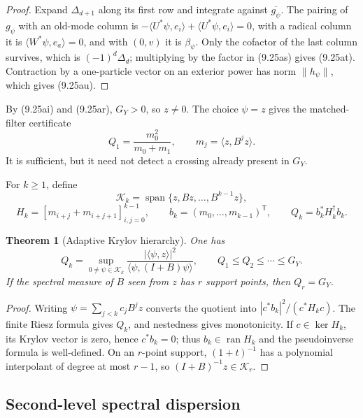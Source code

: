 \documentclass[11pt]{amsart}
\newtheorem{theorem}{Theorem}[section]
\theoremstyle{definition}
\theoremstyle{remark}
\begin{document}
\begin{proof}
Expand \(\Delta_{d+1}\) along its first row and integrate against
\(\overline{g_\psi}\).  The pairing of \(g_\psi\) with an old-mode column
is \(-\langle U^*\psi,e_i\rangle+\langle U^*\psi,e_i\rangle=0\), with a
radical column it is \(\langle W^*\psi,e_a\rangle=0\), and with \((0,v)\)
it is \(\beta_\psi\).  Only the cofactor of the last column survives,
which is \((-1)^d\Delta_d\); multiplying by the factor in (9.25as) gives
(9.25at).  Contraction by a
one-particle vector on an exterior power has norm \(\|h_\psi\|\), which
gives (9.25au).
\end{proof}

By (9.25ai) and (9.25ar), \(G_Y>0\), so \(z\ne0\).  The choice
\(\psi=z\) gives the matched-filter certificate
\[
 Q_1=\frac{m_0^2}{m_0+m_1},
 \qquad m_j=\langle z,B^jz\rangle .
\tag{9.25av}
\]
It is sufficient, but it need not detect a crossing already present in
\(G_Y\).

For \(k\ge1\), define
\[
 \mathcal K_k=\operatorname{span}\{z,Bz,\ldots,B^{k-1}z\},
\]
\[
 H_k=[m_{i+j}+m_{i+j+1}]_{i,j=0}^{k-1},\qquad
 b_k=(m_0,\ldots,m_{k-1})^{\mathsf T},\qquad
 Q_k=b_k^*H_k^\dagger b_k .
\tag{9.25aw}
\]

\begin{theorem}[Adaptive Krylov hierarchy]
\label{thm:adaptive-krylov}
One has
\[
 \boxed{
 Q_k=\sup_{0\ne\psi\in\mathcal K_k}
 \frac{|\langle\psi,z\rangle|^2}
  {\langle\psi,(I+B)\psi\rangle},
 \qquad
 Q_1\le Q_2\le\cdots\le G_Y.}
\tag{9.25ax}
\]
If the spectral measure of \(B\) seen from \(z\) has \(r\) support
points, then \(Q_r=G_Y\).
\end{theorem}

\begin{proof}
Writing \(\psi=\sum_{j<k}c_jB^jz\) converts the quotient into
\(|c^*b_k|^2/(c^*H_kc)\).  The finite Riesz formula gives \(Q_k\), and
nestedness gives monotonicity.  If \(c\in\ker H_k\), its Krylov vector is
zero, hence \(c^*b_k=0\); thus \(b_k\in\operatorname{ran}H_k\) and the
pseudoinverse formula is well-defined.  On an \(r\)-point support,
\((1+t)^{-1}\) has a polynomial interpolant of degree at most \(r-1\),
so \((I+B)^{-1}z\in\mathcal K_r\).
\end{proof}

\subsection{Second-level spectral dispersion}
\label{sec:q2-dispersion}
\end{document}
